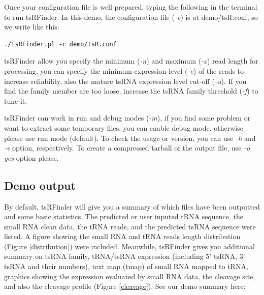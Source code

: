 \documentclass[11pt, a4paper]{article}
\begin{document}
Once your configuration file is well prepared, typing the following in the terminal to run tsRFinder. In this demo, the configuration file (\emph{-c}) is at demo/tsR.conf, so we write like this:

{\footnotesize \begin{tcolorbox}[colback=blue!5!white,colframe=blue!75!black,title=Running tsRFinder demo]
\begin{verbatim}
./tsRFinder.pl -c demo/tsR.conf
\end{verbatim}
\end{tcolorbox}}

tsRFinder allow you specify the minimum (\emph{-n}) and maximum (\emph{-x}) read length for processing, you can specify the minimum expression level (\emph{-e}) of the reads to increase reliability, also the mature tsRNA expression level cut-off (\emph{-u}). If you find the family member are too loose, increase the tsRNA family threshold (\emph{-f}) to tune it.

tsRFinder can work in run and debug modes (\emph{-m}), if you find some problem or want to extract some temporary files, you can enable debug mode, otherwise please use run mode (default). To check the usage or version, you can use \emph{-h} and \emph{-v} option, respectively. To create a compressed tarball of the output file, use \emph{-o yes} option please.

\subsection{Demo output}

By default, tsRFinder will give you a summary of which files have been outputted and some basic statistics. The predicted or user inputed tRNA sequence, the small RNA clean data, the tRNA reads, and the predicted tsRNA sequence were listed. A figure showing the small RNA and tRNA reads length distribution (Figure \ref{distribution}) were included. Meanwhile, tsRFinder gives you additional summary on tsRNA family, tRNA/tsRNA expression (including 5' tsRNA, 3' tsRNA and their numbers), text map (tmap) of small RNA mapped to tRNA, graphics showing the expression evaluated by small RNA data, the cleavage site, and also the cleavage profile (Figure \ref{cleavage}).
See our demo summary here:
\end{document}
